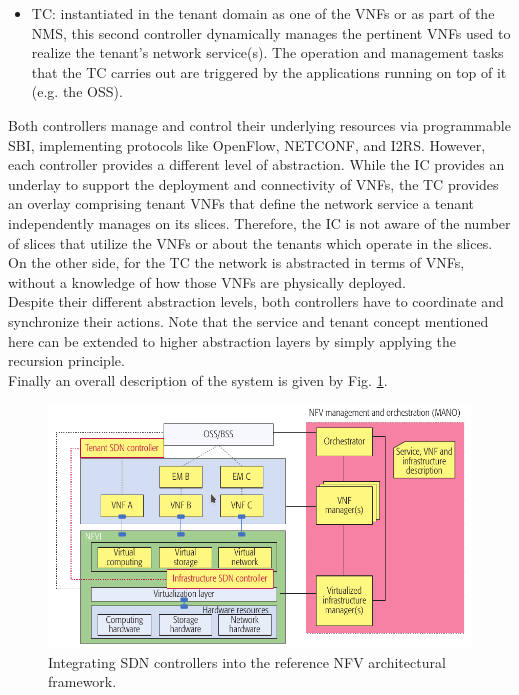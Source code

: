 \documentclass[a4paper,12pt]{report} %
\begin{document}
\begin{itemize}
\item \gls{TC}: instantiated in
the tenant domain as one of the VNFs or as
part of the NMS, this second controller dynamically manages the pertinent VNFs used to realize
the tenant’s network service(s). The operation and management tasks that the
TC carries out are triggered by the applications
running on top of it (e.g. the OSS).
\end{itemize}
Both controllers manage and control their
underlying resources via programmable SBI, implementing protocols like
OpenFlow, NETCONF, and I2RS. However, each
controller provides a different level of abstraction. While the IC provides an underlay to support
the deployment and connectivity of VNFs, the
TC provides an overlay comprising tenant VNFs
that define the network service a tenant independently manages on
its slices. Therefore,
the IC is not aware of the number of slices that utilize the VNFs 
or about the tenants which
operate in the slices. On the other side, for the
TC the network is abstracted in terms of VNFs,
without a knowledge of how those VNFs are physically
deployed. \\
Despite their different abstraction levels,
both controllers have to coordinate and synchronize their actions. Note that the service and
tenant concept mentioned here can be extended
to higher abstraction layers by simply applying the
recursion principle.\\
Finally an overall description of the system is given by Fig. \ref{integral}.
\begin{figure}[h]
\centering
\includegraphics[scale=0.56]{pics/integral.png} 
\caption{Integrating SDN controllers into the reference NFV architectural framework. \cite{ordonez2017network}}
\label{integral}
\end{figure}
\end{document}
